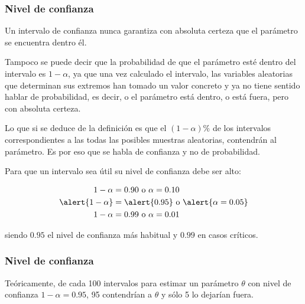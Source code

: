\begin{frame}
\frametitle{Nivel de confianza}
Un intervalo de confianza nunca garantiza con absoluta certeza que el parámetro se encuentra dentro él.

Tampoco se puede decir que la probabilidad de que el parámetro esté dentro del intervalo es $1-\alpha$, ya que una vez calculado el intervalo, las variables aleatorias que determinan sus extremos han tomado un valor concreto y ya no tiene sentido hablar de probabilidad, es decir, o el parámetro está dentro, o está fuera, pero con absoluta certeza.

Lo que si se deduce de la definición es que el $(1-\alpha)\%$ de los intervalos correspondientes a las todas las posibles muestras aleatorias, contendrán al parámetro. Es por eso que se habla de \alert{confianza} y no de probabilidad.

Para que un intervalo sea útil su nivel de confianza debe ser alto:

\begin{align*}
1-\alpha &= 0.90 \mbox{ o } \alpha=0.10\\
\alert{1-\alpha} &= \alert{0.95} \mbox{ o } \alert{\alpha=0.05}\\
1-\alpha &= 0.99 \mbox{ o } \alpha=0.01\\
\end{align*}

siendo $0.95$ el nivel de confianza más habitual y $0.99$ en casos críticos.
\end{frame}


\begin{frame}
\frametitle{Nivel de confianza}
Teóricamente, de cada 100 intervalos para estimar un parámetro $\theta$ con nivel de confianza $1-\alpha=0.95$, 95 contendrían a $\theta$ y sólo 5 lo dejarían fuera.
\begin{center}
\scalebox{0.9}{}
\end{center}
\end{frame}



